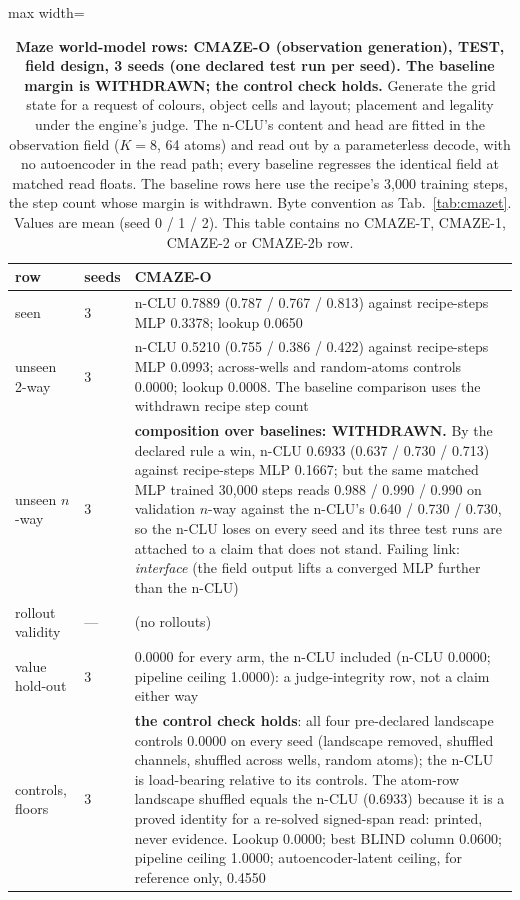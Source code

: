 \documentclass{article} %
\begin{document}
\begin{table}[h]
\centering\scriptsize
\caption{\textbf{Maze world-model rows: CMAZE-O (observation generation), TEST, field design, 3 %
seeds (one declared test run per seed). The baseline margin is WITHDRAWN; the control check holds.} Generate
the grid state for a request of colours, object cells and layout; placement and legality under the engine's judge.
The n-CLU's content and head are fitted in the observation field ($K=8$, 64 atoms) and read out by a parameterless %
decode, with no autoencoder in the read path; every baseline regresses the identical field at matched
read floats. The baseline rows here use the recipe's 3,000 training steps, the step count whose margin is %
withdrawn. Byte convention as Tab.~\ref{tab:cmazet}. Values are mean (seed 0 / 1 / 2). This table
contains no CMAZE-T, CMAZE-1, CMAZE-2 or CMAZE-2b row.}
\label{tab:cmazeo}
\setlength{\tabcolsep}{2pt}
\begin{adjustbox}{max width=\linewidth}\begin{tabular}{p{1.9cm}p{1.2cm}p{10.0cm}}
\toprule
row & seeds & CMAZE-O \\
\midrule
seen & 3 & n-CLU 0.7889 (0.787 / 0.767 / 0.813) against recipe-steps MLP 0.3378; lookup 0.0650 \\
unseen 2-way & 3 & n-CLU 0.5210 (0.755 / 0.386 / 0.422) against recipe-steps MLP 0.0993; across-wells and random-atoms controls 0.0000; lookup 0.0008. The baseline comparison uses the withdrawn recipe step count \\
unseen $n$-way & 3 & \textbf{composition over baselines: WITHDRAWN.} By the declared rule a win, n-CLU 0.6933 (0.637 / 0.730 / 0.713) against recipe-steps MLP 0.1667; but the same matched MLP trained 30,000 steps reads 0.988 / 0.990 / 0.990 on validation $n$-way against the n-CLU's 0.640 / 0.730 / 0.730, so the n-CLU loses on every seed and its three test runs are attached to a claim that does not stand. Failing link: \emph{interface} (the field output lifts a converged MLP further than the n-CLU) \\
rollout validity & --- & (no rollouts) \\
value hold-out & 3 & 0.0000 for every arm, the n-CLU included (n-CLU 0.0000; pipeline ceiling 1.0000): a judge-integrity row, not a claim either way \\
controls, floors & 3 & \textbf{the control check holds}: all four pre-declared landscape controls 0.0000 on every seed (landscape removed, shuffled channels, shuffled across wells, random atoms); the n-CLU is load-bearing relative to its controls. The atom-row landscape shuffled equals the n-CLU (0.6933) because it is a proved identity for a re-solved signed-span read: printed, never evidence. Lookup 0.0000; best BLIND column 0.0600; pipeline ceiling 1.0000; autoencoder-latent ceiling, for reference only, 0.4550 \\

\end{tabular}
\end{adjustbox}
\end{table}
\end{document}
